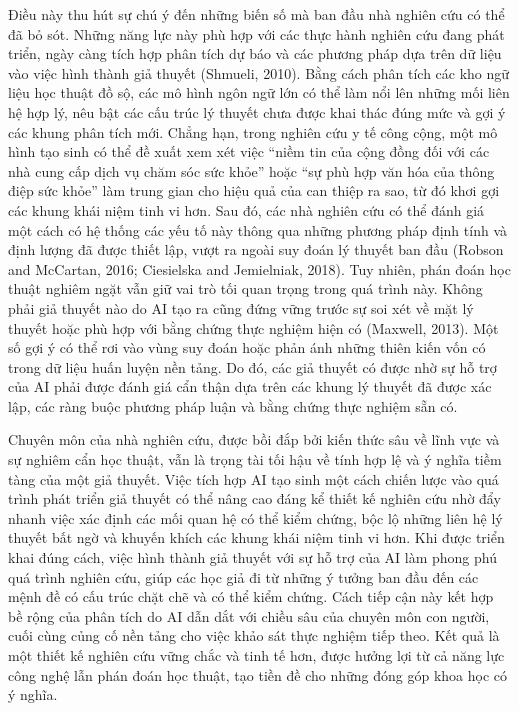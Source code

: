 Điều này thu hút sự chú ý đến những biến số mà ban đầu nhà nghiên cứu có thể đã bỏ sót. Những năng lực này phù hợp với các thực hành nghiên cứu đang phát triển, ngày càng tích hợp phân tích dự báo và các phương pháp dựa trên dữ liệu vào việc hình thành giả thuyết (Shmueli, 2010). Bằng cách phân tích các kho ngữ liệu học thuật đồ sộ, các mô hình ngôn ngữ lớn có thể làm nổi lên những mối liên hệ hợp lý, nêu bật các cấu trúc lý thuyết chưa được khai thác đúng mức và gợi ý các khung phân tích mới. Chẳng hạn, trong nghiên cứu y tế công cộng, một mô hình tạo sinh có thể đề xuất xem xét việc ``niềm tin của cộng đồng đối với các nhà cung cấp dịch vụ chăm sóc sức khỏe'' hoặc ``sự phù hợp văn hóa của thông điệp sức khỏe'' làm trung gian cho hiệu quả của can thiệp ra sao, từ đó khơi gợi các khung khái niệm tinh vi hơn. Sau đó, các nhà nghiên cứu có thể đánh giá một cách có hệ thống các yếu tố này thông qua những phương pháp định tính và định lượng đã được thiết lập, vượt ra ngoài suy đoán lý thuyết ban đầu (Robson and McCartan, 2016; Ciesielska and Jemielniak, 2018). Tuy nhiên, phán đoán học thuật nghiêm ngặt vẫn giữ vai trò tối quan trọng trong quá trình này. Không phải giả thuyết nào do AI tạo ra cũng đứng vững trước sự soi xét về mặt lý thuyết hoặc phù hợp với bằng chứng thực nghiệm hiện có (Maxwell, 2013). Một số gợi ý có thể rơi vào vùng suy đoán hoặc phản ánh những thiên kiến vốn có trong dữ liệu huấn luyện nền tảng. Do đó, các giả thuyết có được nhờ sự hỗ trợ của AI phải được đánh giá cẩn thận dựa trên các khung lý thuyết đã được xác lập, các ràng buộc phương pháp luận và bằng chứng thực nghiệm sẵn có.

Chuyên môn của nhà nghiên cứu, được bồi đắp bởi kiến thức sâu về lĩnh vực và sự nghiêm cẩn học thuật, vẫn là trọng tài tối hậu về tính hợp lệ và ý nghĩa tiềm tàng của một giả thuyết. Việc tích hợp AI tạo sinh một cách chiến lược vào quá trình phát triển giả thuyết có thể nâng cao đáng kể thiết kế nghiên cứu nhờ đẩy nhanh việc xác định các mối quan hệ có thể kiểm chứng, bộc lộ những liên hệ lý thuyết bất ngờ và khuyến khích các khung khái niệm tinh vi hơn. Khi được triển khai đúng cách, việc hình thành giả thuyết với sự hỗ trợ của AI làm phong phú quá trình nghiên cứu, giúp các học giả đi từ những ý tưởng ban đầu đến các mệnh đề có cấu trúc chặt chẽ và có thể kiểm chứng. Cách tiếp cận này kết hợp bề rộng của phân tích do AI dẫn dắt với chiều sâu của chuyên môn con người, cuối cùng củng cố nền tảng cho việc khảo sát thực nghiệm tiếp theo. Kết quả là một thiết kế nghiên cứu vững chắc và tinh tế hơn, được hưởng lợi từ cả năng lực công nghệ lẫn phán đoán học thuật, tạo tiền đề cho những đóng góp khoa học có ý nghĩa.

